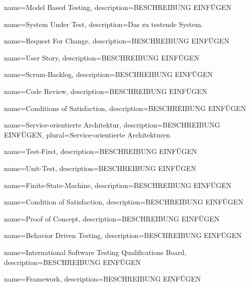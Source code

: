  {
	name={Model Based Testing},
	description={BESCHREIBUNG EINFÜGEN}
}

 {
	name={System Under Test},
	description={Das zu testende System.}
}

 {
	name={Request For Change},
	description={BESCHREIBUNG EINFÜGEN}
}

 {
	name={User Story},
	description={BESCHREIBUNG EINFÜGEN}
}

 {
	name={Scrum-Backlog},
	description={BESCHREIBUNG EINFÜGEN}
}

 {
	name={Code Review},
	description={BESCHREIBUNG EINFÜGEN}
}

 {
	name={Conditions of Satisfaction},
	description={BESCHREIBUNG EINFÜGEN}
}

 {
	name={Service-orientierte Architektur},
	description={BESCHREIBUNG EINFÜGEN},
	plural={Service-orientierte Architekturen}
}


 {
	name={Test-First},
	description={BESCHREIBUNG EINFÜGEN}
}

 {
	name={Unit-Test},
	description={BESCHREIBUNG EINFÜGEN}
}

 {
	name={Finite-State-Machine},
	description={BESCHREIBUNG EINFÜGEN}
}

 {
	name={Condition of Satisfaction},
	description={BESCHREIBUNG EINFÜGEN}
}

 {
	name={Proof of Concept},
	description={BESCHREIBUNG EINFÜGEN}
}

 {
	name={Behavior Driven Testing},
	description={BESCHREIBUNG EINFÜGEN}
}

 {
	name={International Software Testing Qualifications Board},
	description={BESCHREIBUNG EINFÜGEN}
}

 {
	name={Framework},
	description={BESCHREIBUNG EINFÜGEN}
}